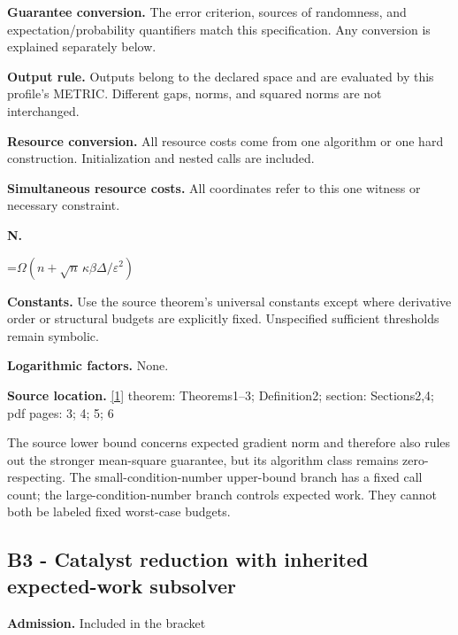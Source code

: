 \documentclass[10pt,a4paper]{article}
\newcommand{\AtlasMath}[1]{\par\begingroup\centering\setbox0=\hbox{$\displaystyle #1$}\ifdim\wd0>1.4\linewidth\typeout{ATLAS WIDE FORMULA: \the\wd0}\fi\ifdim\wd0>\linewidth\resizebox{\linewidth}{!}{\box0}\else\box0\fi\par\endgroup}
\begin{document}
\textbf{Guarantee conversion.} The error criterion, sources of randomness, and expectation/probability quantifiers match this specification. Any conversion is explained separately below.



\textbf{Output rule.} Outputs belong to the declared space and are evaluated by this profile's METRIC. Different gaps, norms, and squared norms are not interchanged.



\textbf{Resource conversion.} All resource costs come from one algorithm or one hard construction. Initialization and nested calls are included.



\textbf{Simultaneous resource costs.} All coordinates refer to this one witness or necessary constraint.



\textbf{N.}



\AtlasMath{\Omega(n+\sqrt n\,\kappa\beta\Delta/\varepsilon^2)}


\textbf{Constants.} Use the source theorem’s universal constants except where derivative order or structural budgets are explicitly fixed. Unspecified sufficient thresholds remain symbolic.



\textbf{Logarithmic factors.} None.



\textbf{Source location.} \href{https://arxiv.org/pdf/2610.04944v1}{[1]} theorem: Theorems1--3; Definition2; section: Sections2,4; pdf pages: 3; 4; 5; 6



The source lower bound concerns expected gradient norm and therefore also rules out the stronger mean-square guarantee, but its algorithm class remains zero-respecting. The small-condition-number upper-bound branch has a fixed call count; the large-condition-number branch controls expected work. They cannot both be labeled fixed worst-case budgets.



\subsection{B3 - Catalyst reduction with inherited expected-work subsolver}


\textbf{Admission.} Included in the bracket
\end{document}
